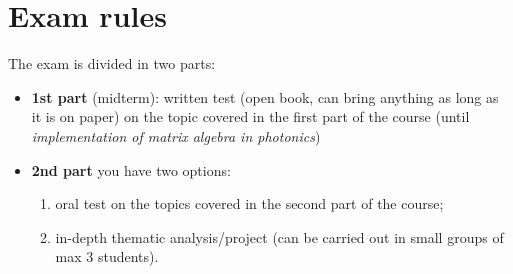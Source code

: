 \section*{Exam rules}

The exam is divided in two parts:
\begin{itemize}
    \item \textbf{1st part} (midterm): written test (open book, can bring anything as long as it is on paper) on the topic covered in the first part of the course (until \textit{implementation of matrix algebra in photonics})
    \item \textbf{2nd part} you have two options:
        \begin{enumerate}
            \item oral test on the topics covered in the second part of the course;
            \item in-depth thematic analysis/project (can be carried out in small groups of max 3 students).
        \end{enumerate}
\end{itemize}

